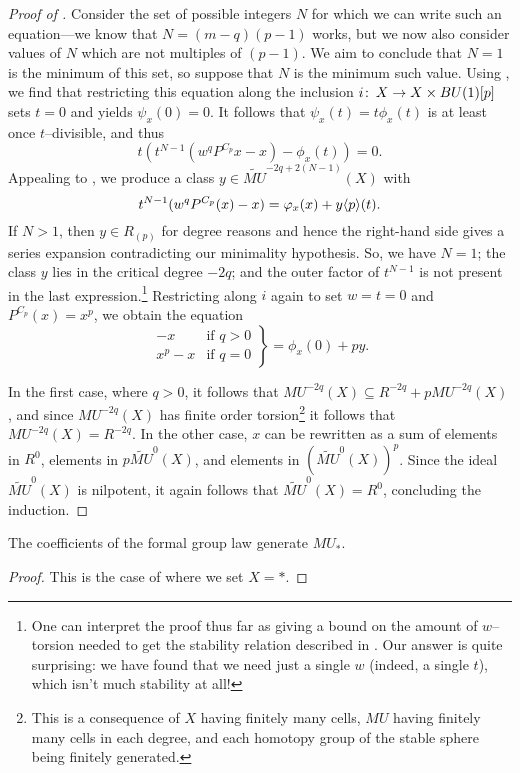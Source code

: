 \begin{proof}[{Proof of }]
Consider the set of possible integers \(N\) for which we can write such an equation---we know that \(N = (m-q)(p - 1)\) works, but we now also consider values of \(N\) which are not multiples of \((p - 1)\).  We aim to conclude that \(N = 1\) is the minimum of this set, so suppose that \(N\) is the minimum such value.  Using , we find that restricting this equation along the inclusion \(i\colon\thinspace X \to X \times BU(1)[p]\) sets \(t = 0\) and yields \(\psi_x(0) = 0\).  It follows that \(\psi_x(t) = t \phi_x(t)\) is at least once \(t\)--divisible, and thus \[t (t^{N-1}(w^q P^{C_p}x - x) - \phi_x(t)) = 0.\]  Appealing to , we produce a class \(y \in \widetilde{MU}^{-2q + 2(N-1)}(X)\) with \[t^{N-1}(w^q P^{C_p}(x) - x) = \varphi_x(x) + y \langle p\rangle(t).\]  If \(N > 1\), then \(y \in R_{(p)}\) for degree reasons and hence the right-hand side gives a series expansion contradicting our minimality hypothesis.  So, we have \(N = 1\); the class \(y\) lies in the critical degree \(-2q\); and the outer factor of \(t^{N-1}\) is not present in the last expression.\footnote{One can interpret the proof thus far as giving a bound on the amount of \(w\)--torsion needed to get the stability relation described in .  Our answer is quite surprising: we have found that we need just a single \(w\) (indeed, a single \(t\)), which isn't much stability at all!}  Restricting along \(i\) again to set \(w = t = 0\) and \(P^{C_p}(x) = x^p\), we obtain the equation \[\left. \begin{array}{rr} -x & \text{if \(q > 0\)} \\ x^p - x & \text{if \(q = 0\)} \end{array} \right\} = \phi_x(0) + py.\]

In the first case, where \(q > 0\), it follows that \(MU^{-2q}(X) \subseteq R^{-2q} + pMU^{-2q}(X)\), and since \(MU^{-2q}(X)\) has finite order torsion\footnote{This is a consequence of \(X\) having finitely many cells, \(MU\) having finitely many cells in each degree, and each homotopy group of the stable sphere being finitely generated.} it follows that \(MU^{-2q}(X) = R^{-2q}\).  In the other case, \(x\) can be rewritten as a sum of elements in \(R^{0}\), elements in \(p \widetilde{MU}^{0}(X)\), and elements in \((\widetilde{MU}^0(X))^p\).  Since the ideal \(\widetilde{MU}^0(X)\) is nilpotent, it again follows that \(\widetilde{MU}^0(X) = R^0\), concluding the induction.
\end{proof}

\begin{corollary}\label{QuillenSurjective}
The coefficients of the formal group law generate \(MU_*\).
\end{corollary}
\begin{proof}
This is the case of  where we set \(X = *\).
\end{proof}

